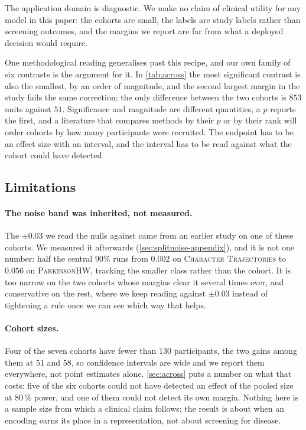 \documentclass[10pt,a4paper]{article}
\begin{document}
The application domain is diagnostic. We make no claim of clinical utility for any model in this
paper: the cohorts are small, the labels are study labels rather than screening outcomes, and the
margins we report are far from what a deployed decision would require.

One methodological reading generalises past this recipe, and our own family of six contrasts is the
argument for it. In \cref{tab:across} the most significant contrast is also the smallest, by an
order of magnitude, and the second largest margin in the study fails the same correction; the only
difference between the two cohorts is $853$ units against $51$. Significance and magnitude are
different quantities, a $p$ reports the first, and a literature that compares methods by their $p$
or by their rank will order cohorts by how many participants were recruited. The endpoint has to be
an effect size with an interval, and the interval has to be read against what the cohort could have
detected.

\subsection{Limitations}
\label{sec:limitations}


\paragraph{The noise band was inherited, not measured.} The $\pm 0.03$ we read the nulls against
came from an earlier study on one of these cohorts. We measured it afterwards
(\cref{sec:splitnoise-appendix}), and it is not one number: half the central $90\%$ runs from
$0.002$ on \textsc{Character Trajectories} to $0.056$ on \textsc{ParkinsonHW}, tracking the smaller
class rather than the cohort. It is too narrow on the two cohorts whose margins clear it several
times over, and conservative on the rest, where we keep reading against $\pm 0.03$ instead of
tightening a rule once we can see which way that helps.

\paragraph{Cohort sizes.} Four of the seven cohorts have fewer than $130$ participants, the two
gains among them at $51$ and $58$, so confidence intervals are wide and we report them everywhere,
not point estimates alone. \cref{sec:across} puts a number on what that costs: five of the six
cohorts could not have detected an effect of the pooled size at $80\,\%$ power, and one of them
could not detect its own margin. Nothing here is a sample size from which a clinical claim
follows; the result is about when an encoding earns its place in a representation, not about
screening for disease.
\end{document}
